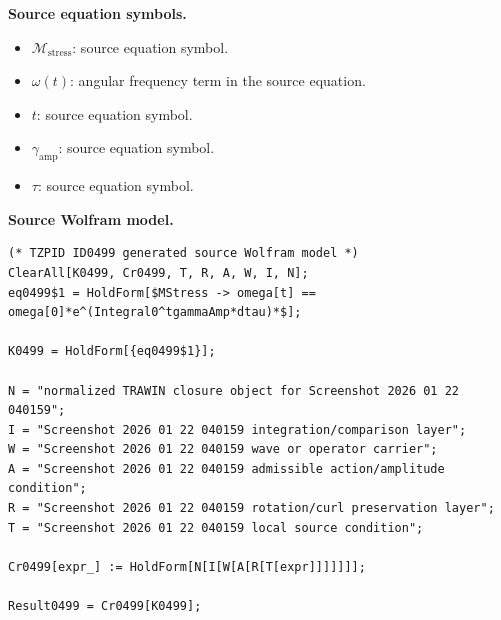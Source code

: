 \begin{minipage}[t]{0.49\linewidth}
\begingroup
\small
\raggedright
\textbf{Source equation symbols.}\par
\begin{itemize}[leftmargin=1.35em,itemsep=1pt,topsep=1pt,parsep=0pt]
    \item $\mathcal{M}_{\mathrm{stress}}$: source equation symbol.
    \item $\omega(t)$: angular frequency term in the source equation.
    \item $t$: source equation symbol.
    \item $\gamma_{\mathrm{amp}}$: source equation symbol.
    \item $\tau$: source equation symbol.
\end{itemize}
\endgroup
\end{minipage}\hfill
\begin{minipage}[t]{0.47\linewidth}
\begingroup
\scriptsize
\raggedright
\textbf{Source Wolfram model.}\par
\begin{Verbatim}[fontsize=\tiny,breaklines=true,breakanywhere=true]
(* TZPID ID0499 generated source Wolfram model *)
ClearAll[K0499, Cr0499, T, R, A, W, I, N];
eq0499$1 = HoldForm[$MStress -> omega[t] == omega[0]*e^(Integral0^tgammaAmp*dtau)*$];

K0499 = HoldForm[{eq0499$1}];

N = "normalized TRAWIN closure object for Screenshot 2026 01 22 040159";
I = "Screenshot 2026 01 22 040159 integration/comparison layer";
W = "Screenshot 2026 01 22 040159 wave or operator carrier";
A = "Screenshot 2026 01 22 040159 admissible action/amplitude condition";
R = "Screenshot 2026 01 22 040159 rotation/curl preservation layer";
T = "Screenshot 2026 01 22 040159 local source condition";

Cr0499[expr_] := HoldForm[N[I[W[A[R[T[expr]]]]]]];

Result0499 = Cr0499[K0499];
\end{Verbatim}
\endgroup
\end{minipage}

